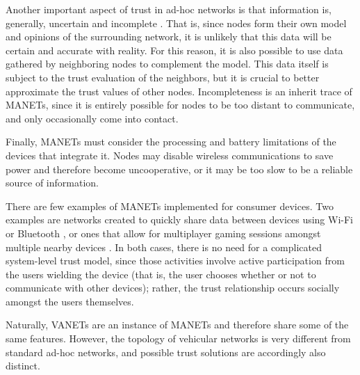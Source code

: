 Another important aspect of trust in ad-hoc networks is that information is, generally, uncertain and incomplete \cite{baras2005cooperation}.
That is, since nodes form their own model and opinions of the surrounding network, it is unlikely that this data will be certain and accurate with reality.
For this reason, it is also possible to use data gathered by neighboring nodes to complement the model.
This data itself is subject to the trust evaluation of the neighbors, but it is crucial to better approximate the trust values of other nodes.
Incompleteness is an inherit trace of MANETs, since it is entirely possible for nodes to be too distant to communicate, and only occasionally come into contact.

Finally, MANETs must consider the processing and battery limitations of the devices that integrate it.
Nodes may disable wireless communications to save power and therefore become uncooperative, or it may be too slow to be a reliable source of information.

There are few examples of MANETs implemented for consumer devices.
Two examples are networks created to quickly share data between devices using Wi-Fi or Bluetooth \cite{krochmal2014discovery}, or ones that allow for multiplayer gaming sessions amongst multiple nearby devices \cite{sasaki2011wireless}.
In both cases, there is no need for a complicated system-level trust model, since those activities involve active participation from the users wielding the device (that is, the user chooses whether or not to communicate with other devices); rather, the trust relationship occurs socially amongst the users themselves.

Naturally, VANETs are an instance of MANETs and therefore share some of the same features.
However, the topology of vehicular networks is very different from standard ad-hoc networks, and possible trust solutions are accordingly also distinct.

